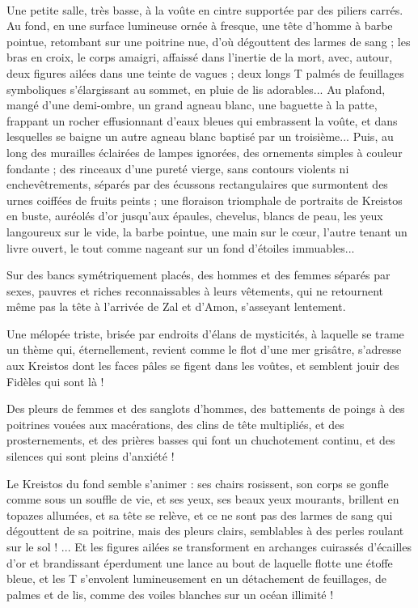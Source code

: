 \documentclass[a4paper, 11pt, oneside, polutonikogreek, french]{article}
\begin{document}
\paragraph{}
Une petite salle, très basse, à la voûte en cintre supportée par des piliers carrés. Au fond, en une surface lumineuse ornée à fresque, une tête d'homme à barbe pointue, retombant sur une poitrine nue, d'où dégouttent des larmes de sang ; les bras en croix, le corps amaigri, affaissé dans l'inertie de la mort, avec, autour, deux figures ailées dans une teinte de vagues ; deux longs T palmés de feuillages symboliques s'élargissant au sommet, en pluie de lis adorables... Au plafond, mangé d'une demi-ombre, un grand agneau blanc, une baguette à la patte, frappant un rocher effusionnant d'eaux bleues qui embrassent la voûte, et dans lesquelles se baigne un autre agneau blanc baptisé par un troisième... Puis, au long des murailles éclairées de lampes ignorées, des ornements simples à couleur fondante ; des rinceaux d'une pureté vierge, sans contours violents ni enchevêtrements, séparés par des écussons rectangulaires que surmontent des urnes coiffées de fruits peints ; une floraison triomphale de portraits de Kreistos en buste, auréolés d'or jusqu'aux épaules, chevelus, blancs de peau, les yeux langoureux sur le vide, la barbe pointue, une main sur le cœur, l'autre tenant un livre ouvert, le tout comme nageant sur un fond d'étoiles immuables...

Sur des bancs symétriquement placés, des hommes et des femmes séparés par sexes, pauvres et riches reconnaissables à leurs vêtements, qui ne retournent même pas la tête à l'arrivée de Zal et d'Amon, s'asseyant lentement.

Une mélopée triste, brisée par endroits d'élans de mysticités, à laquelle se trame un thème qui, éternellement, revient comme le flot d'une mer grisâtre, s'adresse aux Kreistos dont les faces pâles se figent dans les voûtes, et semblent jouir des Fidèles qui sont là !

Des pleurs de femmes et des sanglots d'hommes, des battements de poings à des poitrines vouées aux macérations, des clins de tête multipliés, et des prosternements, et des prières basses qui font un chuchotement continu, et des silences qui sont pleins d'anxiété !

Le Kreistos du fond semble s'animer : ses chairs rosissent, son corps se gonfle comme sous un souffle de vie, et ses yeux, ses beaux yeux mourants, brillent en topazes allumées, et sa tête se relève, et ce ne sont pas des larmes de sang qui dégouttent de sa poitrine, mais des pleurs clairs, semblables à des perles roulant sur le sol ! ... Et les figures ailées se transforment en archanges cuirassés d'écailles d'or et brandissant éperdument une lance au bout de laquelle flotte une étoffe bleue, et les T s'envolent lumineusement en un détachement de feuillages, de palmes et de lis, comme des voiles blanches sur un océan illimité !
\end{document}
